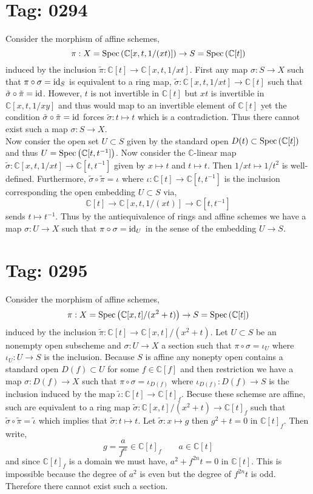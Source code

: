 \documentclass[12pt]{article}
\begin{document}

\section{Tag: 0294}

\renewcommand{\C}{\mathbb{C}}

Consider the morphism of affine schemes,
\[ \pi : X = \Spec{\C[x, t, 1/(xt)]} \to S = \Spec{\C[t]} \]
induced by the inclusion $\tilde{\pi} : \C[t] \to \C[x, t, 1/xt]$.
First any map $\sigma : S \to X$ such that $\pi \circ \sigma = \mathrm{id}_S$ is equivalent to a ring map, $\tilde{\sigma} : \C[x, t, 1/xt] \to \C[t]$ such that $\tilde{\sigma} \circ \tilde{\pi} = \mathrm{id}$. However, $t$ is not invertible in $\C[t]$ but $x t$ is invertible in $\C[x,t, 1/xy]$ and thus would map to an invertible element of $\C[t]$ yet the condition $\tilde{\sigma} \circ \tilde{\pi} = \mathrm{id}$ forces $\tilde{\sigma} : t \mapsto t$ which is a contradiction. Thus there cannot exist such a map $\sigma : S \to X$.
\bigskip\\
Now consier the open set $U \subset S$ given by the standard open $D(t) \subset \Spec{\C[t]}$ and thus $U = \Spec{\C[t,t^{-1}]}$. Now consider the $\C$-linear map $\tilde{\sigma} : \C[x, t, 1/xt] \to \C[t, t^{-1}]$ given by $x \mapsto t$ and $t \mapsto t$. Then $1/xt \mapsto 1/t^2$ is well-defined. Furthermore, $\tilde{\sigma} \circ \tilde{\pi} = \iota$ where $\iota : \C[t] \to \C[t, t^{-1}]$ is the inclusion corresponding the open embedding $U \subset S$ via,
\[ \C[t] \to \C[x,t, 1/(xt)] \to \C[t, t^{-1}] \]
sends $t \mapsto t^{-1}$. Thus by the antiequivalence of rings and affine schemes we have a map $\sigma : U \to X$ such that $\pi \circ \sigma = \mathrm{id}_U$ in the sense of the embedding $U \to S$. 

\section{Tag: 0295}

Consider the morphism of affine schemes,
\[ \pi : X = \Spec{\C[x, t]/(x^2 + t)} \to S = \Spec{\C[t]} \]
induced by the inclusion $\tilde{\pi} : \C[t] \to \C[x, t]/(x^2 + t)$. Let $U \subset S$ be an nonempty open subscheme and $\sigma : U \to X$ a section such that $\pi \circ \sigma = \iota_U$ where $\iota_U : U \to S$ is the inclusion. Because $S$ is affine any nonepty open contains a standard open $D(f) \subset U$ for some $f \in \C[f]$ and then restriction we have a map $\sigma : D(f) \to X$ such that $\pi \circ \sigma = \iota_{D(f)}$ where $\iota_{D(f)} : D(f) \to S$ is the inclusion induced by the map $\tilde{\iota} : \C[t] \to \C[t]_{f}$. Becuse these schemse are affine, such are equivalent to a ring map $\tilde{\sigma} : \C[x, t]/(x^2 + t) \to \C[t]_{f}$ such that $\tilde{\sigma} \circ \tilde{\pi} = \tilde{\iota}$ which implies that $\tilde{\sigma} : t \mapsto t$. Let $\tilde{\sigma} : x \mapsto g$ then $g^2 + t = 0$ in $\C[t]_f$. Then write,
\[ g = \frac{a}{f^n} \in \C[t]_f \quad \quad a \in \C[t] \]
and since $\C[t]_f$ is a domain we must have, $a^2 + f^{2n} t = 0$ in $\C[t]$. This is impossible because the degree of $a^2$ is even but the degree of $f^{2n} t$ is odd. Therefore there cannot exist such a section.  
\end{document}
